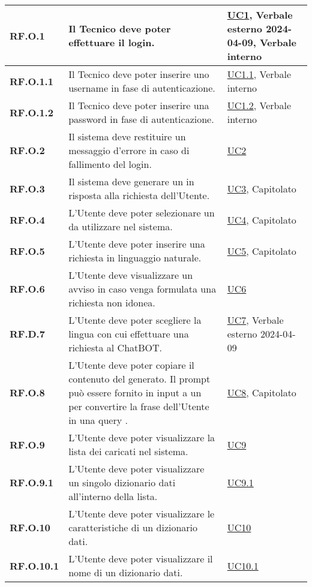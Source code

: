 \begin{adjustwidth}{-0.5cm}{-0.5cm}
\begin{longtable}{|P{3cm}|P{6,5cm}|>{\arraybackslash}P{4cm}|}
    \textbf{RF.O.1} & Il Tecnico deve poter effettuare il login. & \hyperref[UC1]{UC1}, Verbale esterno 2024-04-09, Verbale interno\\
    \hline
    \textbf{RF.O.1.1} & Il Tecnico deve poter inserire uno username in fase di autenticazione. & \hyperref[UC1point1]{UC1.1}, Verbale interno\\
    \hline
    \textbf{RF.O.1.2} & Il Tecnico deve poter inserire una password in fase di autenticazione. & \hyperref[UC1point2]{UC1.2}, Verbale interno\\
    \hline
    \textbf{RF.O.2} & Il sistema deve restituire un messaggio d'errore in caso di fallimento del login. & \hyperref[UC2]{UC2}\\
    \hline
    \textbf{RF.O.3} & Il sistema deve generare un  in risposta alla richiesta dell'Utente. & \hyperref[UC3]{UC3}, Capitolato\\
    \hline
    \textbf{RF.O.4} & L'Utente deve poter selezionare un  da utilizzare nel sistema. & \hyperref[UC4]{UC4}, Capitolato\\
    \hline
    \textbf{RF.O.5} & L'Utente deve poter inserire una richiesta in linguaggio naturale. & \hyperref[UC5]{UC5}, Capitolato\\
    \hline
    \textbf{RF.O.6} & L'Utente deve visualizzare un avviso in caso venga formulata una richiesta non idonea. & \hyperref[UC6]{UC6}\\
    \hline
    \textbf{RF.D.7} & L'Utente deve poter scegliere la lingua con cui effettuare una richiesta al ChatBOT. & \hyperref[UC7]{UC7}, Verbale esterno 2024-04-09\\
    \hline
    \textbf{RF.O.8} & L'Utente deve poter copiare il contenuto del  generato. Il prompt può essere fornito in input a un  per convertire la frase dell'Utente in una query . & \hyperref[UC8]{UC8}, Capitolato\\
    \hline
    \textbf{RF.O.9} & L'Utente deve poter visualizzare la lista dei  caricati nel sistema. & \hyperref[UC9]{UC9}\\
    \hline
    \textbf{RF.O.9.1} & L'Utente deve poter visualizzare un singolo dizionario dati all'interno della lista. & \hyperref[UC9point1]{UC9.1}\\
    \hline
    \textbf{RF.O.10} & L'Utente deve poter visualizzare le caratteristiche di un dizionario dati. & \hyperref[UC10]{UC10}\\
    \hline
    \textbf{RF.O.10.1} & L'Utente deve poter visualizzare il nome di un dizionario dati. & \hyperref[UC10point1]{UC10.1}\\

\end{longtable}
\end{adjustwidth}
